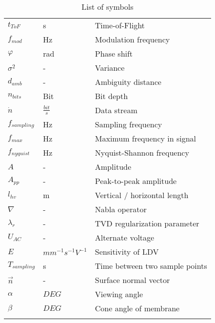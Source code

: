 \begin{longtable}[l]{p{150pt} p{150pt} p{200pt}}
$t_{ToF}$ & s & Time-of-Flight \\
$f_{mod}$ & Hz & Modulation frequency\\
$\varphi$ & rad & Phase shift\\
$\sigma^2$ & - & Variance\\
$d_{amb}$ & - & Ambiguity distance\\
$n_{bits}$ & Bit & Bit depth\\
$\dot n $ & $\frac{bit}{s}$ & Data stream\\
$f_{sampling}$ & Hz & Sampling frequency\\
$f_{max}$ & Hz & Maximum frequency in signal\\
$f_{nyquist}$ & Hz & Nyquist-Shannon frequency\\  
$A$ & - & Amplitude\\
$A_{pp}$ & - & Peak-to-peak amplitude \\
$l_{hv}$ & m & Vertical / horizontal length \\   
$\nabla$ & - & Nabla operator\\
$\lambda_r$ & - & TVD regularization parameter\\
$U_{AC}$ & - & Alternate voltage\\
$E$ & $mm^{-1}s^{-1}V^{-1}$ & Sensitivity of LDV\\
$T_{sampling}$ & s & Time between two sample points\\
$ \vec{n}$ & - & Surface normal vector\\
$\alpha$ & $DEG$ & Viewing angle \\
$\beta $ & $DEG$ & Cone angle of membrane\\
\caption{List of symbols}
\end{longtable} 

\begin{table}
\vspace{1 mm}  
\end{table}

\begin{table}
\vspace{1 mm}
\end{table}